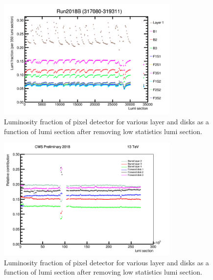 \begin{figure}[!htp]
\centering
\includegraphics[width=0.8\textwidth]{ashish_thesis/pcc_stability_begin.png}
\caption{%
   Luminosity fraction of pixel detector for various layer and disks as a function of lumi section after removing low statistics lumi section.
}
\label{fig:PCC_stab_begin}
\end{figure}




\begin{figure}[!htp]
\centering
\includegraphics[width=0.8\textwidth]{ashish_thesis/pcc_frac_L0_veto.png}
\caption{%
   Luminosity fraction of pixel detector for various layer and disks as a function of lumi section after removing low statistics lumi section.
}
\label{fig:PCC_stab_L0_veto}
\end{figure}




